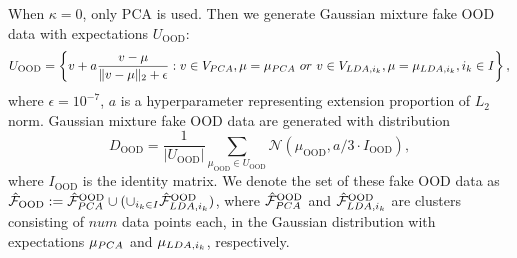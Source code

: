 \documentclass{article}
\theoremstyle{plain}
\theoremstyle{definition}
\theoremstyle{remark}
\begin{document}
When $\kappa=0$, only PCA is used. 
%
Then we generate Gaussian mixture fake OOD data with expectations $U_{{\text{OOD}}}$:
\begin{equation}
    U_{{\text{OOD}}} = \left\{v + a \frac{v-\mu}{\|v-\mu\|_2+\epsilon}: v \in V_{{\rm PCA}}, \mu=\mu_{{\rm PCA}}~ or~v \in V_{{\rm LDA},i_k}, \mu=\mu_{{\rm LDA},i_k}, i_k\in I \right\},
    \label{eq: 24}
\end{equation}
where $\epsilon=10^{-7}$, $a$ is a hyperparameter representing extension proportion of $L_2$ norm.
%
Gaussian mixture fake OOD data are generated with distribution
\begin{equation}
    D_{{\text{OOD}}} = \frac{1}{|U_{{\text{OOD}}}|}\sum_{\mu_{{\text{OOD}}}\in U_{{\text{OOD}}}}\mathcal{N}(\mu_{{\text{OOD}}},a/3 \cdot I_{{\text{OOD}}}),
    \label{eq: 25-1}
\end{equation}
where $I_{{\text{OOD}}}$ is the identity matrix. 
We denote the set of these fake OOD data as $\hat{\mathcal{F}}_{{\text{OOD}}}: = \hat{\mathcal{F}}^{{\text{OOD}}}_{{\rm PCA}}\cup (\cup_{i_k\in I}\hat{\mathcal{F}}^{{\text{OOD}}}_{{\rm LDA},i_k})$, where $\hat{\mathcal{F}}^{{\text{OOD}}}_{{\rm PCA}}$ and $\hat{\mathcal{F}}^{{\text{OOD}}}_{{\rm LDA},i_k}$ are clusters consisting of $num$ data points each, in the Gaussian distribution with expectations $\mu_{{\rm PCA}}$ and $\mu_{{\rm LDA},i_k}$, respectively.
\end{document}
